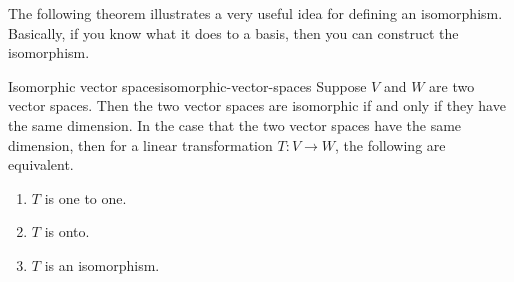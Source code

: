 The following theorem illustrates a very useful idea for defining an
isomorphism. Basically, if you know what it does to a basis, then you can
construct the isomorphism.

\begin{theorem}{Isomorphic vector spaces}{isomorphic-vector-spaces}
Suppose $V$ and $W$ are two vector spaces. Then the two vector spaces are isomorphic if and only
if they have the same dimension. In the case that the two vector spaces have
the same dimension, then for
 a linear transformation $T:V\rightarrow W$, the
following are equivalent.

\begin{enumerate}
\item $T$ is one to one.

\item $T$ is onto.

\item $T$ is an isomorphism.
\end{enumerate}
\end{theorem}

